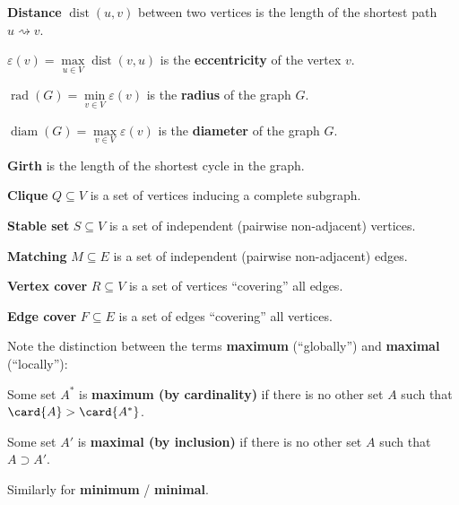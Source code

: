 \documentclass[a4paper,12pt]{article}
\newcommand{\op}[1]{\operatorname*{#1}}
\newcommand{\dist}[1]{\op{dist}(#1)}
\newcommand{\eccentricity}[1]{\varepsilon(#1)}
\newcommand{\graphRadius}[1]{\op{rad}(#1)}
\newcommand{\graphDiameter}[1]{\op{diam}(#1)}
\begin{document}
\begin{terms}
    \item \textbf{Distance} $\dist{u,v}$ between two vertices is the length of the shortest path $u \rightsquigarrow v$.

    \begin{terms}
        \item $\eccentricity{v} = \max\limits_{u \in V} \dist{v,u}$ is the \textbf{eccentricity} of the vertex $v$.
        \item $\graphRadius{G} = \min\limits_{v \in V} \eccentricity{v}$ is the \textbf{radius} of the graph $G$.
        \item $\graphDiameter{G} = \max\limits_{v \in V} \eccentricity{v}$ is the \textbf{diameter} of the graph $G$.
    \end{terms}

    \item \textbf{Girth} is the length of the shortest cycle in the graph.

    \item \textbf{Clique} $Q \subseteq V$ is a set of vertices inducing a complete subgraph.

    \item \textbf{Stable set} $S \subseteq V$ is a set of independent (pairwise non-adjacent) vertices.

    \item \textbf{Matching} $M \subseteq E$ is a set of independent (pairwise non-adjacent) edges.

    \item \textbf{Vertex cover} $R \subseteq V$ is a set of vertices \enquote{covering} all edges.

    \item \textbf{Edge cover} $F \subseteq E$ is a set of edges \enquote{covering} all vertices.

    \item Note the distinction between the terms \textbf{maximum} (\enquote{globally}) and \textbf{maximal} (\enquote{locally}):
    \begin{terms}
        \newcommand{\MySet}{A}
        \item Some set $\MySet^{*}$ is \textbf{maximum (by cardinality)} if there is no other set $\MySet$ such that $\card{\MySet} > \card{\MySet^{*}}$.
        \item Some set $\MySet'$ is \textbf{maximal (by inclusion)} if there is no other set $\MySet$ such that $\MySet \supset \MySet'$.
        \item Similarly for \textbf{minimum} / \textbf{minimal}.
    \end{terms}
\end{terms}
\end{document}
